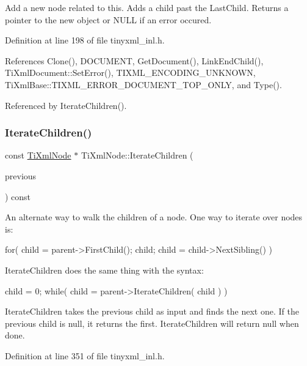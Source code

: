 Add a new node related to this. Adds a child past the Last\+Child. Returns a pointer to the new object or N\+U\+LL if an error occured. 

Definition at line 198 of file tinyxml\+\_\+inl.\+h.



References Clone(), D\+O\+C\+U\+M\+E\+NT, Get\+Document(), Link\+End\+Child(), Ti\+Xml\+Document\+::\+Set\+Error(), T\+I\+X\+M\+L\+\_\+\+E\+N\+C\+O\+D\+I\+N\+G\+\_\+\+U\+N\+K\+N\+O\+WN, Ti\+Xml\+Base\+::\+T\+I\+X\+M\+L\+\_\+\+E\+R\+R\+O\+R\+\_\+\+D\+O\+C\+U\+M\+E\+N\+T\+\_\+\+T\+O\+P\+\_\+\+O\+N\+LY, and Type().



Referenced by Iterate\+Children().

\hypertarget{class_ti_xml_node_a67c3a02b797f08d9a31b2553661257e1}{}\label{class_ti_xml_node_a67c3a02b797f08d9a31b2553661257e1} 
\subsubsection{\texorpdfstring{Iterate\+Children()}{IterateChildren()}\hspace{0.1cm}{\footnotesize\ttfamily [1/6]}}
{\footnotesize\ttfamily const \hyperlink{class_ti_xml_node}{Ti\+Xml\+Node} $\ast$ Ti\+Xml\+Node\+::\+Iterate\+Children (\begin{DoxyParamCaption}\item[{const \hyperlink{class_ti_xml_node}{Ti\+Xml\+Node} $\ast$}]{previous }\end{DoxyParamCaption}) const}

An alternate way to walk the children of a node. One way to iterate over nodes is\+: \begin{DoxyVerb}for( child = parent->FirstChild(); child; child = child->NextSibling() )
\end{DoxyVerb}


Iterate\+Children does the same thing with the syntax\+: \begin{DoxyVerb}child = 0;
while( child = parent->IterateChildren( child ) )
\end{DoxyVerb}


Iterate\+Children takes the previous child as input and finds the next one. If the previous child is null, it returns the first. Iterate\+Children will return null when done. 

Definition at line 351 of file tinyxml\+\_\+inl.\+h.



